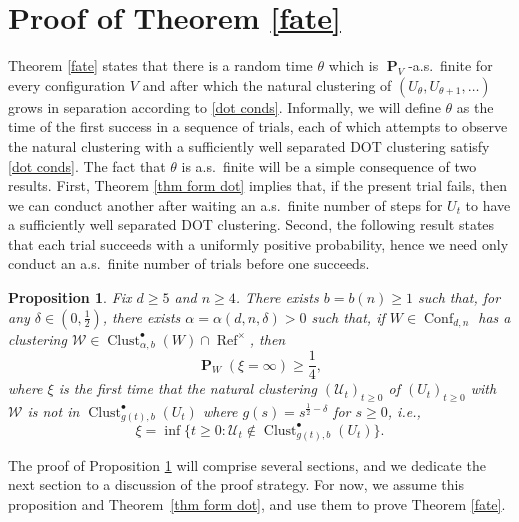 \documentclass[11pt,reqno]{amsart}
\newtheorem{proposition}[lemma]{Proposition}
\theoremstyle{definition}
\numberwithin{equation}{section}
\newcommand{\1}{\mathbf{1}}
\DeclareMathOperator{\PP}{\mathbf{P}}
\DeclareMathOperator{\Refcon}{\mathrm{Ref}}
\newcommand{\UU}{\mathcal{U}}
\DeclareMathOperator{\Conf}{\mathrm{Conf}}
\DeclareMathOperator{\Clust}{\mathrm{Clust}}
\begin{document}
\section{Proof of Theorem \ref{fate}}\label{sec fate}

Theorem \ref{fate} states that there is a random time $\theta$ which is $\PP_V$-a.s.\ finite for every configuration $V$ and after which the natural clustering of $(U_\theta, U_{\theta+1}, \dots)$ grows in separation according to \eqref{dot conds}. Informally, we will define $\theta$ as the time of the first success in a sequence of trials, each of which attempts to observe the natural clustering with a sufficiently well separated DOT clustering satisfy \eqref{dot conds}. The fact that $\theta$ is a.s.\ finite will be a simple consequence of two results. First, Theorem \ref{thm form dot} implies that, if the present trial fails, then we can conduct another after waiting an a.s.\ finite number of steps for $U_t$ to have a sufficiently well separated DOT clustering. Second, the following result states that each trial succeeds with a uniformly positive probability, hence we need only conduct an a.s.\ finite number of trials before one succeeds.

\begin{proposition}\label{inf xi}
Fix $d \geq 5$ and $n \geq 4$. There exists $b = b (n) \geq 1$ such that, for any $\delta \in (0,\frac12)$, there exists $\alpha = \alpha (d,n,\delta) > 0$ such that, if $W \in \Conf_{d,n}$ has a clustering $\mathcal{W} \in \Clust_{\alpha,b}^\bullet (W) \cap \Refcon^\times$, then 
\begin{equation}\label{eq inf xi}
\PP_{W} (\xi = \infty) \geq \frac14,
\end{equation}
where $\xi$ is the first time that the natural clustering $(\UU_t)_{t \geq 0}$ of $(U_t)_{t \geq 0}$ with $\mathcal{W}$ is not in $\Clust_{g(t),b}^\bullet (U_t)$ where $g(s) = s^{\frac12 - \delta}$ for $s \geq 0$, i.e., 
\[
\xi = \inf \{t \geq 0: \UU_t \notin \Clust_{g(t),b}^\bullet (U_t)\}.
\]
\end{proposition}

The proof of Proposition \ref{inf xi} will comprise several sections, and we dedicate the next section to a discussion of the proof strategy. For now, we assume this proposition and Theorem~\ref{thm form dot}, and use them to prove Theorem \ref{fate}.
\end{document}
